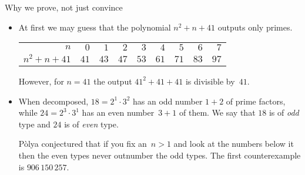 \documentclass[10pt,t]{beamer}
\begin{document}
\begin{frame}{Why we prove, not just convince}

\begin{itemize}
\pause\item
At first we may guess that the polynomial $n^2+n+41$ 
outputs only primes. 
\begin{center} \small\smallskip
  \begin{tabular}{r|rrrrrrrr}
    $n$        &$0$  &$1$  &$2$  &$3$  &$4$  &$5$  &$6$  &$7$ \\ \cline{2-9}
    $n^2+n+41$ &$41$ &$43$ &$47$ &$53$ &$61$ &$71$ &$83$ &$97$
  \end{tabular}\smallskip
\end{center}
\pause
However,  
for $n=41$ the output $41^2+41+41$ is divisible by~$41$.

\pause
\item 
When decomposed, $18=2^1\cdot 3^2$ has an odd number $1+2$ of 
prime factors, while
$24=2^3\cdot 3^1$ has an even number~$3+1$ of them.
We say that $18$ is of \textit{odd} type and
$24$ is of \textit{even} type.
\begin{center} \small\smallskip
  \smallskip
\end{center}
P\`olya conjectured that if you fix an~$n>1$ and look at the numbers below it 
then the even types never outnumber the odd types. 
\pause
The first counterexample is $906\,150\,257$. 
\end{itemize}
\end{frame}
\end{document}
